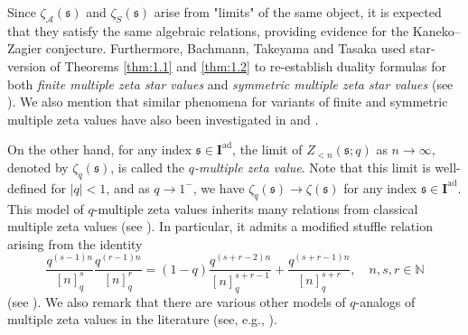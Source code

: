 \documentclass[12pt,reqno]{amsart}
\numberwithin{equation}{section}
\theoremstyle{plain}
\theoremstyle{definition}
\theoremstyle{remark}
\newcommand{\NN}{\mathbb{N}}
\newcommand{\Acal}{\mathcal{A}}
\newcommand{\ww}[1]{\mathfrak{#1}}
\newcommand{\Ical}{\mathbf{I}}
\newcommand{\ad}{\mathrm{ad}}
\begin{document}
Since $\zeta_\Acal(\ww{s})$ and $\zeta_S(\ww{s})$ arise from "limits" of the same object, it is expected that they satisfy the same algebraic relations, providing evidence for the Kaneko--Zagier conjecture. Furthermore, Bachmann, Takeyama and Tasaka used star-version of Theorems \ref{thm:1.1} and \ref{thm:1.2} to re-establish duality formulas for both \textit{finite multiple zeta star values} and \textit{symmetric multiple zeta star values} (see \cite[Theorem 1.3]{BTT18}). We also mention that similar phenomena for variants of finite and symmetric multiple zeta values have also been investigated in \cite{BTT21} and \cite{Tasaka21}.

On the other hand, for any index $\ww{s}\in\Ical^{\ad}$, the limit of $Z_{<n}(\ww{s};q)$ as $n\to\infty$, denoted by $\zeta_q(\ww{s})$, is called the \textit{$q$-multiple zeta value}. Note that this limit is well-defined for $|q|<1$, and as $q\to 1^-$, we have $\zeta_q(\ww{s})\to \zeta(\ww{s})$ for any index $\ww{s}\in\Ical^{\ad}$. This model of $q$-multiple zeta values inherits many relations from classical multiple zeta values (see \cite{Bradley2005, OkudaTakeyama2007, Zhao2007}). In particular, it admits a modified stuffle relation arising from the identity
$$\frac{q^{(s-1)n}}{[n]_q^s}\frac{q^{(r-1)n}}{[n]_q^r}=(1-q)\frac{q^{(s+r-2)n}}{[n]_q^{s+r-1}}+\frac{q^{(s+r-1)n}}{[n]_q^{s+r}},\quad n,s,r\in\NN$$
(see \cite[(2.2)]{Bradley2005}). We also remark that there are various other models of $q$-analogs of multiple zeta values in the literature (see, e.g., \cite{Schlesinger2001, Zudilin2003, Okounkov2014, Bachmann2020}).
\end{document}
